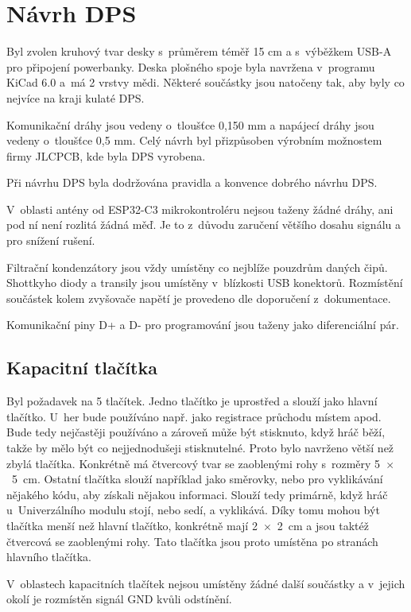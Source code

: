 \chapter{Návrh DPS}
Byl zvolen kruhový tvar desky s~průměrem téměř 15 cm a s~výběžkem USB-A pro připojení powerbanky. Deska plošného spoje byla navržena v~programu KiCad 6.0 a~má 2 vrstvy mědi. 
Některé součástky jsou natočeny tak, aby byly co nejvíce na kraji kulaté DPS.

Komunikační dráhy jsou vedeny o~tloušťce 0,150 mm a napájecí dráhy jsou vedeny o~tloušťce 0,5 mm. Celý návrh byl přizpůsoben výrobním možnostem firmy JLCPCB, kde byla DPS vyrobena.

Při návrhu DPS byla dodržována pravidla a konvence dobrého návrhu DPS.

V~oblasti antény od ESP32-C3 mikrokontroléru nejsou taženy žádné dráhy, ani pod ní není rozlitá žádná měď. Je to z~důvodu zaručení většího dosahu signálu a pro snížení rušení. 

Filtrační kondenzátory jsou vždy umístěny co nejblíže pouzdrům daných čipů. Shottkyho diody a transily jsou umístěny v~blízkosti USB konektorů. Rozmístění součástek kolem zvyšovače napětí 
je provedeno dle doporučení z~dokumentace. 

Komunikační piny D+ a D- pro programování jsou taženy jako diferenciální pár.

\section{Kapacitní tlačítka} 
Byl požadavek na 5 tlačítek. Jedno tlačítko je uprostřed a slouží jako hlavní tlačítko. U~her bude používáno např. jako registrace průchodu místem apod. Bude tedy nejčastěji
používáno a zároveň může být stisknuto, když hráč běží, takže by mělo být co nejjednodušeji stisknutelné. Proto bylo navrženo větší než zbylá tlačítka. Konkrétně má 
čtvercový tvar se zaoblenými rohy s~rozměry 5~$\times$~5~cm. Ostatní tlačítka slouží například jako směrovky, nebo pro vyklikávání nějakého kódu, aby získali nějakou informaci. 
Slouží tedy primárně, když hráč u~Univerzálního modulu stojí, nebo sedí, a vyklikává. Díky tomu mohou být tlačítka menší než hlavní tlačítko, konkrétně mají 2~$\times$~2~cm 
a jsou taktéž čtvercová se zaoblenými rohy. Tato tlačítka jsou proto umístěna po stranách hlavního tlačítka.

V~oblastech kapacitních tlačítek nejsou umístěny žádné další součástky a v~jejich okolí je rozmístěn signál GND kvůli odstínění. 


